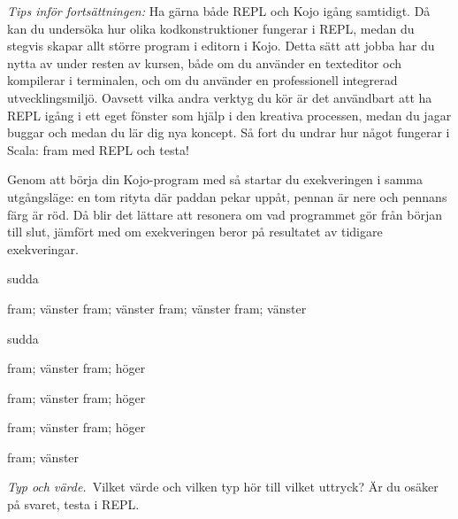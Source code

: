 \begin{framed}
\noindent\emph{Tips inför fortsättningen:} Ha gärna både REPL och Kojo igång samtidigt. Då kan du undersöka hur olika kodkonstruktioner fungerar i REPL, medan du stegvis skapar allt större program i editorn i Kojo. Detta sätt att jobba har du nytta av under resten av kursen, både om du använder en texteditor och kompilerar i terminalen, och om du använder en professionell integrerad utvecklingsmiljö. Oavsett vilka andra verktyg du kör är det användbart att ha REPL igång i ett eget fönster som hjälp i den kreativa processen, medan du jagar buggar och medan du lär dig nya koncept. Så fort du undrar hur något fungerar i Scala: fram med REPL och testa!
\end{framed}


\SOLUTION

\TaskSolved \what
 
\SubtaskSolved Genom att börja din Kojo-program med  så startar du exekveringen i samma utgångsläge: en tom rityta  där paddan pekar uppåt, pennan är nere och pennans färg är röd.  Då blir det lättare att resonera om vad programmet gör från början till slut, jämfört med om exekveringen beror på resultatet av tidigare exekveringar.


\SubtaskSolved
\begin{Code}
sudda

fram; vänster
fram; vänster
fram; vänster
fram; vänster
\end{Code}


\SubtaskSolved
\begin{Code}
sudda

fram; vänster
fram; höger

fram; vänster
fram; höger

fram; vänster
fram; höger

fram; vänster
\end{Code}


\QUESTEND









\clearpage

\ExtraTasks %



\def\what{\emph{Typ och värde.}}

\QUESTBEGIN

\Task \what~Vilket värde och vilken typ hör till vilket uttryck?  Är du osäker på svaret, testa i REPL.

